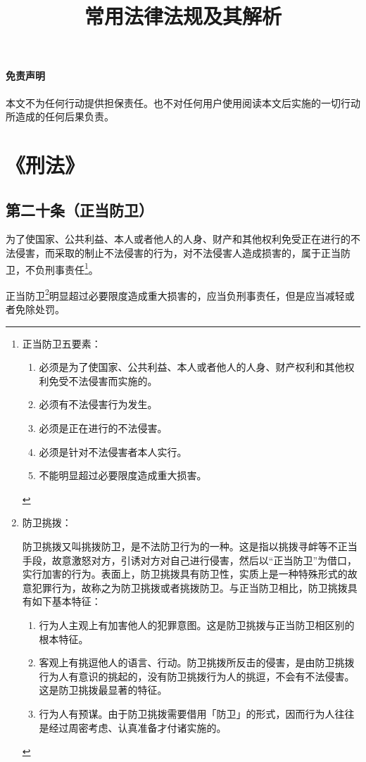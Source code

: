\documentclass[utf-8,10pt]{ctexart}
\title{\textbf{常用法律法规及其解析}}
\begin{document}
\setcounter{page}{0}
\maketitle
\thispagestyle{empty}
\newpage
\pagestyle{fancy}
\tableofcontents
\newpage{}
\paragraph{}
\noindent{}
\paragraph{免责声明}
本文不为任何行动提供担保责任。也不对任何用户使用阅读本文后实施的一切行动所造成的任何后果负责。
\section{《刑法》}
\subsection{第二十条（正当防卫）}
为了使国家、公共利益、本人或者他人的人身、财产和其他权利免受正在进行的不法侵害，而采取的制止不法侵害的行为，对不法侵害人造成损害的，属于正当防卫，不负刑事责任\footnote{
正当防卫五要素：
\begin{enumerate}
\item 必须是为了使国家、公共利益、本人或者他人的人身、财产权利和其他权利免受不法侵害而实施的。
\item 必须有不法侵害行为发生。
\item 必须是正在进行的不法侵害。
\item 必须是针对不法侵害者本人实行。
\item 不能明显超过必要限度造成重大损害。
\end{enumerate}
}。

正当防卫\footnote{防卫挑拨：


防卫挑拨又叫挑拨防卫，是不法防卫行为的一种。这是指以挑拨寻衅等不正当手段，故意激怒对方，引诱对方对自己进行侵害，然后以“正当防卫”为借口，实行加害的行为。表面上，防卫挑拨具有防卫性，实质上是一种特殊形式的故意犯罪行为，故称之为防卫挑拨或者挑拨防卫。与正当防卫相比，防卫挑拨具有如下基本特征：
\begin{enumerate}
\item 行为人主观上有加害他人的犯罪意图。这是防卫挑拨与正当防卫相区别的根本特征。
\item 客观上有挑逗他人的语言、行动。防卫挑拨所反击的侵害，是由防卫挑拨行为人有意识的挑起的，没有防卫挑拨行为人的挑逗，不会有不法侵害。这是防卫挑拨最显著的特征。
\item 行为人有预谋。由于防卫挑拨需要借用「防卫」的形式，因而行为人往往是经过周密考虑、认真准备才付诸实施的。
\end{enumerate}

}明显超过必要限度造成重大损害的，应当负刑事责任，但是应当减轻或者免除处罚。
\end{document}
